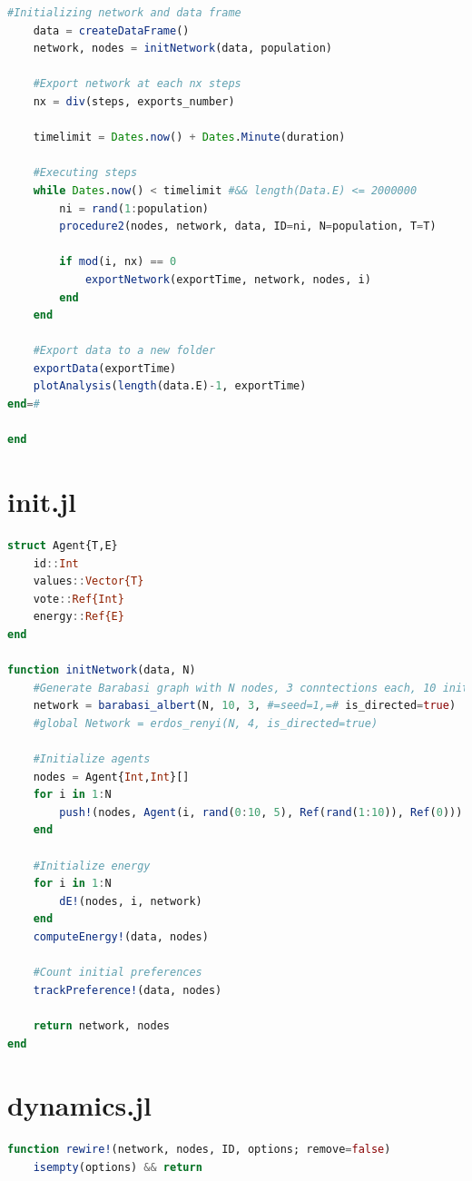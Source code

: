 \documentclass[12pt,openright,twoside]{book}
\begin{document}
\begin{appendices}
\begin{lstlisting}[language=julia]
    #Initializing network and data frame
    data = createDataFrame()
    network, nodes = initNetwork(data, population)

    #Export network at each nx steps
    nx = div(steps, exports_number) 

    timelimit = Dates.now() + Dates.Minute(duration)
    
    #Executing steps
    while Dates.now() < timelimit #&& length(Data.E) <= 2000000
        ni = rand(1:population)
        procedure2(nodes, network, data, ID=ni, N=population, T=T)

        if mod(i, nx) == 0
            exportNetwork(exportTime, network, nodes, i)
        end
    end

    #Export data to a new folder
    exportData(exportTime)
    plotAnalysis(length(data.E)-1, exportTime)
end=#

end

\end{lstlisting}

\vspace{14pt}

\section{init.jl}
\begin{lstlisting}[language=julia]
struct Agent{T,E}
    id::Int
    values::Vector{T}
    vote::Ref{Int}
    energy::Ref{E}
end

function initNetwork(data, N)
    #Generate Barabasi graph with N nodes, 3 conntections each, 10 initial nodes
    network = barabasi_albert(N, 10, 3, #=seed=1,=# is_directed=true)
    #global Network = erdos_renyi(N, 4, is_directed=true)
    
    #Initialize agents
    nodes = Agent{Int,Int}[]
    for i in 1:N
        push!(nodes, Agent(i, rand(0:10, 5), Ref(rand(1:10)), Ref(0)))
    end
    
    #Initialize energy
    for i in 1:N
        dE!(nodes, i, network)
    end
    computeEnergy!(data, nodes)

    #Count initial preferences
    trackPreference!(data, nodes)

    return network, nodes
end

\end{lstlisting}

\vspace{14pt}

\section{dynamics.jl}
\begin{lstlisting}[language=julia]
function rewire!(network, nodes, ID, options; remove=false)
    isempty(options) && return


\end{lstlisting}
\end{appendices}
\end{document}
